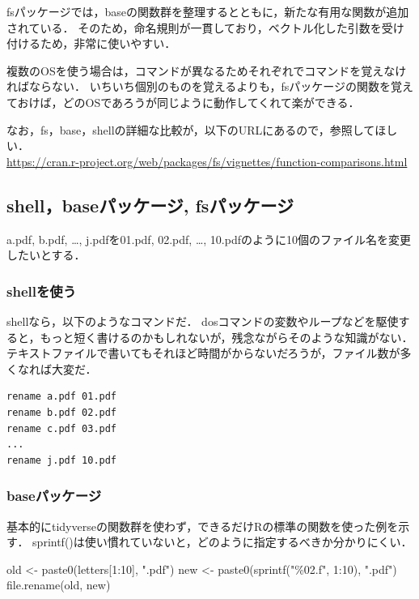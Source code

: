 \documentclass[
]{article}
\newenvironment{Shaded}{\begin{snugshade}}{\end{snugshade}}
\newcommand{\DecValTok}[1]{\textcolor[rgb]{0.00,0.00,0.81}{#1}}
\newcommand{\FunctionTok}[1]{\textcolor[rgb]{0.00,0.00,0.00}{#1}}
\newcommand{\NormalTok}[1]{#1}
\newcommand{\OtherTok}[1]{\textcolor[rgb]{0.56,0.35,0.01}{#1}}
\newcommand{\SpecialCharTok}[1]{\textcolor[rgb]{0.00,0.00,0.00}{#1}}
\newcommand{\StringTok}[1]{\textcolor[rgb]{0.31,0.60,0.02}{#1}}
\begin{document}
fsパッケージでは，baseの関数群を整理するとともに，新たな有用な関数が追加されている．
そのため，命名規則が一貫しており，ベクトル化した引数を受け付けるため，非常に使いやすい．

複数のOSを使う場合は，コマンドが異なるためそれぞれでコマンドを覚えなければならない．
いちいち個別のものを覚えるよりも，fsパッケージの関数を覚えておけば，どのOSであろうが同じように動作してくれて楽ができる．

なお，fs，base，shellの詳細な比較が，以下のURLにあるので，参照してほしい．\\
\url{https://cran.r-project.org/web/packages/fs/vignettes/function-comparisons.html}

\hypertarget{shellbaseux30d1ux30c3ux30b1ux30fcux30b8-fsux30d1ux30c3ux30b1ux30fcux30b8}{%
\subsection{shell，baseパッケージ, fsパッケージ}\label{shellbaseux30d1ux30c3ux30b1ux30fcux30b8-fsux30d1ux30c3ux30b1ux30fcux30b8}}

a.pdf, b.pdf, \ldots, j.pdfを01.pdf, 02.pdf, \ldots, 10.pdfのように10個のファイル名を変更したいとする．

\hypertarget{shellux3092ux4f7fux3046}{%
\subsubsection{shellを使う}\label{shellux3092ux4f7fux3046}}

shellなら，以下のようなコマンドだ．
dosコマンドの変数やループなどを駆使すると，もっと短く書けるのかもしれないが，残念ながらそのような知識がない．
テキストファイルで書いてもそれほど時間がからないだろうが，ファイル数が多くなれば大変だ．

\begin{verbatim}
rename a.pdf 01.pdf
rename b.pdf 02.pdf
rename c.pdf 03.pdf
...
rename j.pdf 10.pdf
\end{verbatim}

\hypertarget{baseux30d1ux30c3ux30b1ux30fcux30b8}{%
\subsubsection{baseパッケージ}\label{baseux30d1ux30c3ux30b1ux30fcux30b8}}

基本的にtidyverseの関数群を使わず，できるだけRの標準の関数を使った例を示す．
sprintf()は使い慣れていないと，どのように指定するべきか分かりにくい．

\begin{Shaded}
\begin{Highlighting}[]
\NormalTok{old }\OtherTok{\textless{}{-}} \FunctionTok{paste0}\NormalTok{(letters[}\DecValTok{1}\SpecialCharTok{:}\DecValTok{10}\NormalTok{], }\StringTok{".pdf"}\NormalTok{)}
\NormalTok{new }\OtherTok{\textless{}{-}} \FunctionTok{paste0}\NormalTok{(}\FunctionTok{sprintf}\NormalTok{(}\StringTok{"\%02.f"}\NormalTok{, }\DecValTok{1}\SpecialCharTok{:}\DecValTok{10}\NormalTok{), }\StringTok{".pdf"}\NormalTok{)}
\FunctionTok{file.rename}\NormalTok{(old, new)}
\end{Highlighting}
\end{Shaded}
\end{document}
